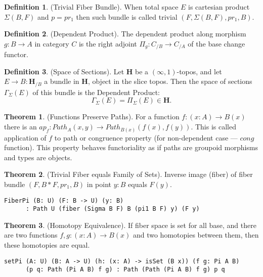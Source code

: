 \documentclass{article}
\theoremstyle{definition}
\newtheorem{definition}{Definition}
\newtheorem{theorem}{Theorem}
\begin{document}
\begin{definition} (Trivial Fiber Bundle).
When total space $E$ is cartesian product $\Sigma(B,F)$ and $p = pr_1$
then such bundle is called trivial $(F,\Sigma(B,F),pr_1,B)$.
\end{definition}

\begin{definition} (Dependent Product).
The dependent product along morphism $g: B \rightarrow A$ in category $C$ is the right
adjoint $\Pi_g : C_{/B} \rightarrow C_{/A}$ of the base change functor.
\end{definition}

\begin{definition} (Space of Sections).
Let $\mathbf{H}$ be a $(\infty,1)$-topos, and let $E \rightarrow B : \mathbf{H}_{/B}$ a bundle in
$\mathbf{H}$, object in the slice topos. Then the space of sections $\Gamma_\Sigma(E)$
of this bundle is the Dependent Product:
$$ \Gamma_\Sigma(E) = \Pi_\Sigma (E) \in \mathbf{H}. $$
\end{definition}

\begin{theorem} (Functions Preserve Paths).
For a function $f: (x:A) \rightarrow B(x)$
there is an $ap_f : Path_A(x,y) \rightarrow Path_{B(x)}(f(x),f(y))$. This is called
application of $f$ to path or congruence property (for non-dependent case ---
$cong$ function). This property behaves functoriality
as if paths are groupoid morphisms and types are objects.
\end{theorem}

\begin{theorem} (Trivial Fiber equals Family of Sets).
Inverse image (fiber) of fiber bundle $(F,B*F,pr_1,B)$ in point $y:B$ equals $F(y)$.
\begin{lstlisting}
FiberPi (B: U) (F: B -> U) (y: B)
      : Path U (fiber (Sigma B F) B (pi1 B F) y) (F y)
\end{lstlisting}
\end{theorem}

\begin{theorem} (Homotopy Equivalence).
If fiber space is set for all base, and
there are two functions $f,g : (x:A) \rightarrow B(x)$ and two
homotopies between them, then these homotopies are equal.
\begin{lstlisting}
setPi (A: U) (B: A -> U) (h: (x: A) -> isSet (B x)) (f g: Pi A B)
      (p q: Path (Pi A B) f g) : Path (Path (Pi A B) f g) p q
\end{lstlisting}
\end{theorem}
\end{document}
